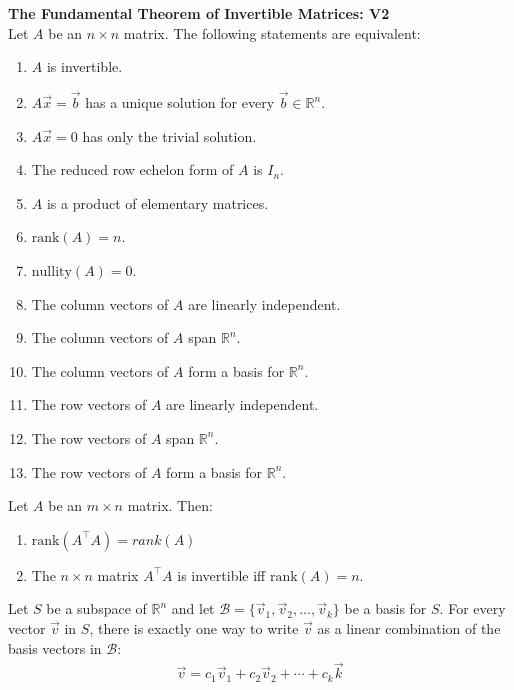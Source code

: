 \documentclass{article}
\begin{document}
\begin{theorem}
    \textbf{The Fundamental Theorem of Invertible Matrices: V2}\\
    Let $A$ be an $n\times n$ matrix. The following statements are equivalent:
    \begin{enumerate}
        \item $A$ is invertible.
        \item $A\vec x = \vec b$ has a unique solution for every $\vec b\in\mathbb{R}^n$.
        \item $A\vec x = 0$ has only the trivial solution.
        \item The reduced row echelon form of $A$ is $I_n$.
        \item $A$ is a product of elementary matrices.
        \item $\text{rank}(A)=n$.
        \item $\text{nullity}(A)=0$.
        \item The column vectors of $A$ are linearly independent.
        \item The column vectors of $A$ span $\mathbb{R}^n$.
        \item The column vectors of $A$ form a basis for $\mathbb{R}^n$.
        \item The row vectors of $A$ are linearly independent.
        \item The row vectors of $A$ span $\mathbb{R}^n$.
        \item The row vectors of $A$ form a basis for $\mathbb{R}^n$.
    \end{enumerate}
\end{theorem}
\begin{theorem}
    Let $A$ be an $m\times n$ matrix. Then:
    \begin{enumerate}
        \item $\text{rank}(A^\intercal A) = rank(A)$
        \item The $n\times n$ matrix $A^\intercal A$ is invertible iff $\text{rank}(A)=n$.
    \end{enumerate}
\end{theorem}
\begin{theorem}
    Let $S$ be a subspace of $\mathbb{R}^n$ and let $\mathcal{B}=\{\vec v_1, \vec v_2, ..., \vec v_k\}$ be a basis for $S$. For every vector $\vec v$ in $S$, there is exactly one way to write $\vec v$ as a linear combination of the basis vectors in $\mathcal{B}$:
    \begin{gather*}
        \vec v = c_1\vec v_1 + c_2\vec v_2 + \cdots + c_k\vec k
    \end{gather*}
\end{theorem}
\end{document}
